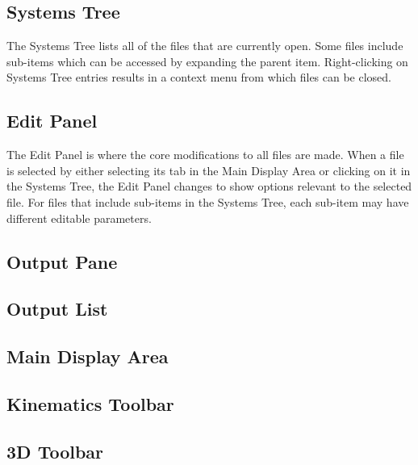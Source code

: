 \subsection{Systems Tree} \label{ssec:systemsTree}

The Systems Tree lists all of the files that are currently open.  Some files include sub-items which can be accessed by expanding the parent item.  Right-clicking on Systems Tree entries results in a context menu from which files can be closed.


\subsection{Edit Panel} \label{ssec:editPanel}

The Edit Panel is where the core modifications to all files are made.  When a file is selected by either selecting its tab in the Main Display Area or clicking on it in the Systems Tree, the Edit Panel changes to show options relevant to the selected file.  For files that include sub-items in the Systems Tree, each sub-item may have different editable parameters.

\subsection{Output Pane} \label{ssec:outputPane}



\subsection{Output List} \label{ssec:outputList}



\subsection{Main Display Area} \label{ssec:mainDisplayArea}



\subsection{Kinematics Toolbar} \label{ssec:kinematicsToolbar}



\subsection{3D Toolbar} \label{ssec:3DToolbar}



